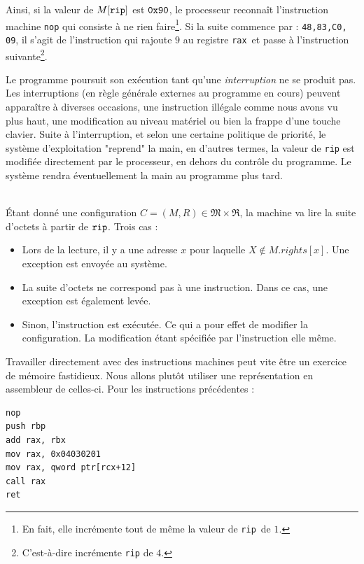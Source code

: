 \documentclass{book}
\newenvironment{formalisme}[1]{%
	\def\FrameCommand{\fboxrule=\FrameRule\fboxsep=\FrameSep \fcolorbox{red!10}{red!5}}%
	\MakeFramed {\advance\hsize-\width \FrameRestore}
	\noindent {\bf #1}\\
}%
{\endMakeFramed}
\newcommand{\code}[1]{\texttt{#1}}
\newcommand{\rip}{{\tt rip}\xspace}
\newcommand{\rax}{{\tt rax}\xspace}
\newcommand{\hexa}[1]{{\tt 0x#1}}
\newcommand{\vReg}{{\mathfrak{R}}}
\newcommand{\Memory}{{\mathfrak{M}}}
\begin{document}
Ainsi, si la valeur de  $M[\rip]$ est $\hexa{90}$, le processeur reconnaît l'instruction machine \code{nop} qui consiste à ne rien faire\footnote{En fait, elle incrémente tout de même la valeur de \rip\ de $1$. }. Si la suite commence par : \code{48,83,C0, 09},  il s'agit de l'instruction qui rajoute $9$ au registre \rax\ et passe à l'instruction suivante\footnote{C'est-à-dire incrémente \rip de $4$.}.  

Le programme  poursuit son exécution tant qu'une \emph{interruption} ne se produit pas. Les interruptions (en règle générale externes au programme en cours) peuvent apparaître à diverses occasions, une instruction illégale comme nous avons vu plus haut, une modification au niveau matériel ou bien la frappe d'une touche clavier. Suite à l'interruption, et selon une certaine politique de priorité, le système d'exploitation "reprend" la main, en d'autres termes, la valeur de \rip est modifiée directement par le processeur, en dehors du contrôle du programme. Le système rendra éventuellement la main au programme plus tard. 

\begin{formalisme}{Exécution}
\'Etant donné une configuration $C = (M, R) \in \Memory \times \vReg$, la machine va lire la suite d'octets à partir de $\rip$. Trois cas : 
\begin{itemize}
	\item Lors de la lecture, il y a une adresse $x$ pour laquelle $X \not\in M.rights[x]$. Une exception est envoyée au système. 
	\item La suite d'octets ne correspond pas à une instruction. Dans ce cas, une exception est également levée. 
	\item Sinon, l'instruction est exécutée. Ce qui a pour effet de modifier la configuration. La modification étant spécifiée par l'instruction elle même.
\end{itemize}
\end{formalisme}

Travailler directement avec des instructions machines peut vite être un exercice de mémoire fastidieux. Nous allons plutôt utiliser une représentation en assembleur de celles-ci. Pour les instructions précédentes : 
\begin{verbatim}
nop
push rbp
add rax, rbx
mov rax, 0x04030201
mov rax, qword ptr[rcx+12]
call rax
ret
\end{verbatim}
\end{document}
